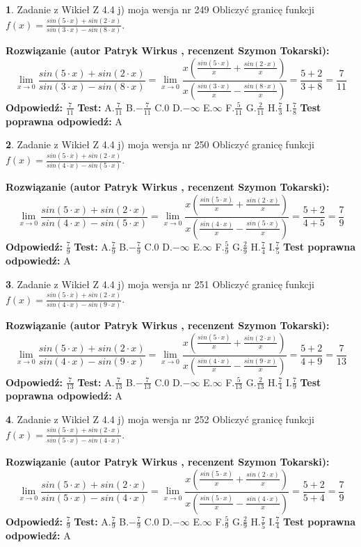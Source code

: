 \documentclass[12pt, a4paper]{article}
\theoremstyle{definition} %
\newtheorem{zad}{}
\newcommand{\zadStart}[1]{\begin{zad}#1\newline}
\newcommand{\zadStop}{\end{zad}}
\newcommand{\rozwStart}[2]{\noindent \textbf{Rozwiązanie (autor #1 , recenzent #2): }\newline}
\newcommand{\rozwStop}{\newline}
\newcommand{\odpStart}{\noindent \textbf{Odpowiedź:}\newline}
\newcommand{\odpStop}{\newline}
\newcommand{\testStart}{\noindent \textbf{Test:}\newline}
\newcommand{\testStop}{\newline}
\newcommand{\kluczStart}{\noindent \textbf{Test poprawna odpowiedź:}\newline}
\newcommand{\kluczStop}{\newline}
\begin{document}
\zadStart{Zadanie z Wikieł Z 4.4 j) moja wersja nr 249}
Obliczyć granicę funkcji $f(x)=\frac{sin(5\cdot x) +sin(2\cdot x)}{sin(3\cdot x) -sin(8\cdot x)}$.
\zadStop
\rozwStart{Patryk Wirkus}{Szymon Tokarski}
$$\lim\limits_{x\to 0}\frac{sin(5\cdot x) +sin(2\cdot x)}{sin(3\cdot x) -sin(8\cdot x)}=\lim\limits_{x\to 0}\frac{x(\frac{sin(5\cdot x)}{x}+\frac{sin(2\cdot x)}{x})}{x(\frac{sin(3\cdot x)}{x}-\frac{sin(8\cdot x)}{x})}=\frac{5+2}{3+8} = \frac{7}{11}$$
\rozwStop
\odpStart
$\frac{7}{11}$
\odpStop
\testStart
A.$\frac{7}{11}$
B.$-\frac{7}{11}$
C.$0$
D.$-\infty$
E.$\infty$
F.$\frac{5}{11}$
G.$\frac{2}{11}$
H.$\frac{7}{3}$
I.$\frac{7}{8}$
\testStop
\kluczStart
A
\kluczStop



\zadStart{Zadanie z Wikieł Z 4.4 j) moja wersja nr 250}
Obliczyć granicę funkcji $f(x)=\frac{sin(5\cdot x) +sin(2\cdot x)}{sin(4\cdot x) -sin(5\cdot x)}$.
\zadStop
\rozwStart{Patryk Wirkus}{Szymon Tokarski}
$$\lim\limits_{x\to 0}\frac{sin(5\cdot x) +sin(2\cdot x)}{sin(4\cdot x) -sin(5\cdot x)}=\lim\limits_{x\to 0}\frac{x(\frac{sin(5\cdot x)}{x}+\frac{sin(2\cdot x)}{x})}{x(\frac{sin(4\cdot x)}{x}-\frac{sin(5\cdot x)}{x})}=\frac{5+2}{4+5} = \frac{7}{9}$$
\rozwStop
\odpStart
$\frac{7}{9}$
\odpStop
\testStart
A.$\frac{7}{9}$
B.$-\frac{7}{9}$
C.$0$
D.$-\infty$
E.$\infty$
F.$\frac{5}{9}$
G.$\frac{2}{9}$
H.$\frac{7}{4}$
I.$\frac{7}{5}$
\testStop
\kluczStart
A
\kluczStop



\zadStart{Zadanie z Wikieł Z 4.4 j) moja wersja nr 251}
Obliczyć granicę funkcji $f(x)=\frac{sin(5\cdot x) +sin(2\cdot x)}{sin(4\cdot x) -sin(9\cdot x)}$.
\zadStop
\rozwStart{Patryk Wirkus}{Szymon Tokarski}
$$\lim\limits_{x\to 0}\frac{sin(5\cdot x) +sin(2\cdot x)}{sin(4\cdot x) -sin(9\cdot x)}=\lim\limits_{x\to 0}\frac{x(\frac{sin(5\cdot x)}{x}+\frac{sin(2\cdot x)}{x})}{x(\frac{sin(4\cdot x)}{x}-\frac{sin(9\cdot x)}{x})}=\frac{5+2}{4+9} = \frac{7}{13}$$
\rozwStop
\odpStart
$\frac{7}{13}$
\odpStop
\testStart
A.$\frac{7}{13}$
B.$-\frac{7}{13}$
C.$0$
D.$-\infty$
E.$\infty$
F.$\frac{5}{13}$
G.$\frac{2}{13}$
H.$\frac{7}{4}$
I.$\frac{7}{9}$
\testStop
\kluczStart
A
\kluczStop



\zadStart{Zadanie z Wikieł Z 4.4 j) moja wersja nr 252}
Obliczyć granicę funkcji $f(x)=\frac{sin(5\cdot x) +sin(2\cdot x)}{sin(5\cdot x) -sin(4\cdot x)}$.
\zadStop
\rozwStart{Patryk Wirkus}{Szymon Tokarski}
$$\lim\limits_{x\to 0}\frac{sin(5\cdot x) +sin(2\cdot x)}{sin(5\cdot x) -sin(4\cdot x)}=\lim\limits_{x\to 0}\frac{x(\frac{sin(5\cdot x)}{x}+\frac{sin(2\cdot x)}{x})}{x(\frac{sin(5\cdot x)}{x}-\frac{sin(4\cdot x)}{x})}=\frac{5+2}{5+4} = \frac{7}{9}$$
\rozwStop
\odpStart
$\frac{7}{9}$
\odpStop
\testStart
A.$\frac{7}{9}$
B.$-\frac{7}{9}$
C.$0$
D.$-\infty$
E.$\infty$
F.$\frac{5}{9}$
G.$\frac{2}{9}$
H.$\frac{7}{5}$
I.$\frac{7}{4}$
\testStop
\kluczStart
A
\kluczStop
\end{document}
